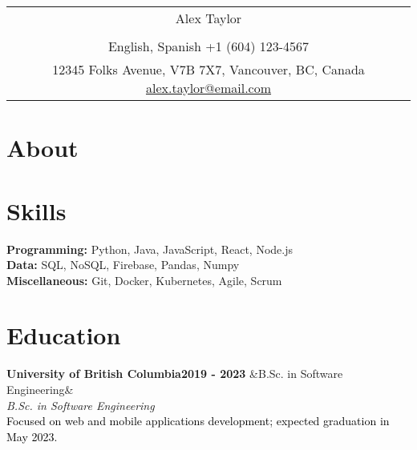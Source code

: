 \documentclass[a4paper,8pt]{article}
\newcommand{\entry}[4]{
    \noindent\textbf{\color{headerColor}#1}\hfill\textbf{\color{subHeaderColor}#2}
    \ifx&#3&\else\\\noindent\textit{\color{subHeaderColor}#3}\fi
      \\#4
    \vspace{5pt} %
  }
\begin{document}
  \pagestyle{empty}
  
  \begin{tabularx}{\linewidth}{@{} C @{}}
  
  \color{headerColor} \Huge{Alex Taylor} \\[6pt]\\
  \textcolor{subHeaderColor}{\raisebox{-0.05\height}{\faLanguage} English, Spanish }
\textcolor{subHeaderColor}{\raisebox{-0.05\height}{\faMobile} +1 (604) 123-4567 }
\\\textcolor{subHeaderColor}{\raisebox{-0.05\height}{\faMapMarker} 12345 Folks Avenue, V7B 7X7, Vancouver, BC, Canada          }
\textcolor{subHeaderColor}{{\href{mailto:alex.taylor@email.com}{\raisebox{-0.05\height}{\faEnvelope} alex.taylor@email.com}} }
\end{tabularx}
\color{headerColor}\section{About}\vspace{1ex}\color{black}{Enthusiastic and innovative software engineer with a passion for developing user-centric applications and a knack for problem-solving. Seeking challenging opportunities to apply my skills in a dynamic team environment. }\color{headerColor}\section{Skills}
\vspace{1ex}
  \color{headerColor}\textbf{Programming:} \color{black} Python, Java, JavaScript, React, Node.js
\\
  \color{headerColor}\textbf{Data:} \color{black} SQL, NoSQL, Firebase, Pandas, Numpy
\\
  \color{headerColor}\textbf{Miscellaneous:} \color{black} Git, Docker, Kubernetes, Agile, Scrum

  \color{headerColor}\section{Education}
\vspace{1ex}
  \entry{University of British Columbia}
      {2019 - 2023}
      {B.Sc. in Software Engineering}
      {\textcolor{black}{Focused on web and mobile applications development; expected graduation in May 2023.}}
\end{document}
